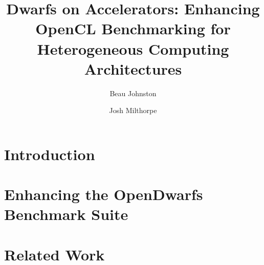 \documentclass[sigconf,preprint,9pt]{acmart}
\begin{document}
\title[Dwarfs on Accelerators]{Dwarfs on Accelerators: Enhancing OpenCL Benchmarking for Heterogeneous Computing Architectures}

\author{Beau Johnston}

\author{Josh Milthorpe}

\begin{abstract}
	
\end{abstract}


\maketitle

\section{Introduction}
\section{Enhancing the OpenDwarfs Benchmark Suite}

\section{Related Work}
\end{document}
